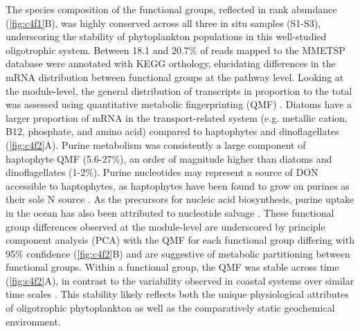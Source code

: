 The species composition of the functional groups, reflected in rank abundance (\cref{fig:c4f1}B), was highly conserved across all three in situ samples (S1-S3), underscoring the stability of phytoplankton populations in this well-studied oligotrophic system. Between 18.1 and 20.7\% of reads mapped to the MMETSP database were annotated with KEGG orthology, elucidating differences in the mRNA distribution between functional groups at the pathway level. Looking at the module-level, the general distribution of transcripts in proportion to the total was assessed using quantitative metabolic fingerprinting (QMF) \citep{Alexander2015}. Diatoms have a larger proportion of mRNA in the transport-related system (e.g. metallic cation, B12, phosphate, and amino acid) compared to haptophytes and dinoflagellates (\cref{fig:c4f2}A). Purine metabolism was consistently a large component of haptophyte QMF (5.6-27\%), an order of magnitude higher than diatoms and dinoflagellates (1-2\%). Purine nucleotides may represent a source of DON accessible to haptophytes, as haptophytes have been found to grow on purines as their sole N source \citep{Palenik1997}. As the precursors for nucleic acid biosynthesis, purine uptake in the ocean has also been attributed to nucleotide salvage \citep{Winn1984}. These functional group differences observed at the module-level are underscored by principle component analysis (PCA) with the QMF for each functional group differing with 95\% confidence (\cref{fig:c4f2}B) and are suggestive of metabolic partitioning between functional groups. Within a functional group, the QMF was stable across time (\cref{fig:c4f2}A), in contrast to the variability observed in coastal systems over similar time scales \citep{Alexander2015, Dupont2015}. This stability likely reflects both the unique physiological attributes of oligotrophic phytoplankton as well as the comparatively static geochemical environment. \par

